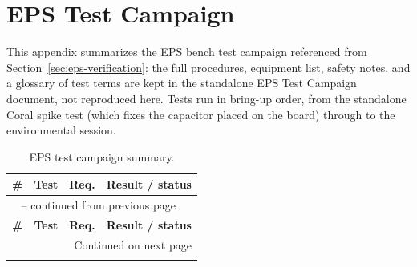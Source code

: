 \chapter{EPS Test Campaign}
\label{app:eps-tests}

This appendix summarizes the EPS bench test campaign referenced from
Section~\ref{sec:eps-verification}: the full procedures, equipment list,
safety notes, and a glossary of test terms are kept in the standalone EPS
Test Campaign document, not reproduced here. Tests run in bring-up order,
from the standalone Coral spike test (which fixes the capacitor placed on
the board) through to the environmental session.

\small
\begin{longtable}{p{0.9cm}p{3.2cm}p{1.6cm}p{8.5cm}}
\caption{EPS test campaign summary.}
\label{tab:eps-tests} \\
\toprule
\textbf{\#} & \textbf{Test} & \textbf{Req.} & \textbf{Result / status} \\
\midrule
\endfirsthead
\multicolumn{4}{l}{\tablename\ \thetable{} -- continued from previous page} \\
\toprule
\textbf{\#} & \textbf{Test} & \textbf{Req.} & \textbf{Result / status} \\
\midrule
\endhead
\midrule
\multicolumn{4}{r}{Continued on next page} \\
\endfoot
\bottomrule
\endlastfoot


\end{longtable}
